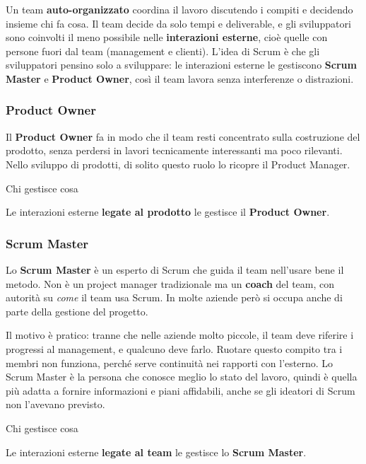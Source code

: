 Un team \textbf{auto-organizzato} coordina il lavoro discutendo i
compiti e decidendo insieme chi fa cosa. Il team decide da solo tempi e
deliverable, e gli sviluppatori sono coinvolti il meno possibile nelle
\textbf{interazioni esterne}, cioè quelle con persone fuori dal team
(management e clienti). L'idea di Scrum è che gli sviluppatori pensino
solo a sviluppare: le interazioni esterne le gestiscono \textbf{Scrum
Master} e \textbf{Product Owner}, così il team lavora senza interferenze
o distrazioni.

\subsubsection{Product Owner}\label{product-owner}

Il \textbf{Product Owner} fa in modo che il team resti concentrato sulla
costruzione del prodotto, senza perdersi in lavori tecnicamente
interessanti ma poco rilevanti. Nello sviluppo di prodotti, di solito
questo ruolo lo ricopre il Product Manager.

\begin{boxtip}{Chi gestisce cosa}

Le interazioni esterne \textbf{legate al prodotto} le gestisce il
\textbf{Product Owner}.

\end{boxtip}

\subsubsection{Scrum Master}\label{scrum-master}

Lo \textbf{Scrum Master} è un esperto di Scrum che guida il team
nell'usare bene il metodo. Non è un project manager tradizionale ma un
\textbf{coach} del team, con autorità su \emph{come} il team usa Scrum.
In molte aziende però si occupa anche di parte della gestione del
progetto.

Il motivo è pratico: tranne che nelle aziende molto piccole, il team
deve riferire i progressi al management, e qualcuno deve farlo. Ruotare
questo compito tra i membri non funziona, perché serve continuità nei
rapporti con l'esterno. Lo Scrum Master è la persona che conosce meglio
lo stato del lavoro, quindi è quella più adatta a fornire informazioni e
piani affidabili, anche se gli ideatori di Scrum non l'avevano previsto.

\begin{boxtip}{Chi gestisce cosa}

Le interazioni esterne \textbf{legate al team} le gestisce lo
\textbf{Scrum Master}.

\end{boxtip}

